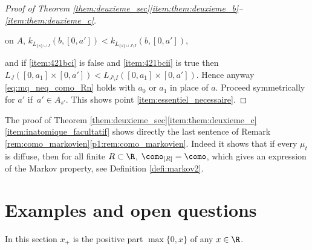 \begin{proof}[Proof of Theorem \ref{them:deuxieme_sec}\eqref{item:them:deuxieme_b}--\eqref{item:them:deuxieme_c}]
\begin{enumeratei}
\item\label{item:421bcii}
on $A$, $k_{L_{\{s\}\cup J}}(b,[0,a'])< k_{L_{\{s\}\cup J\setminus I}}(b,[0,a'])$,
\end{enumeratei}
\noindent
and if \eqref{item:421bci} is false and \eqref{item:421bcii} is true then $L_{ J}([0,a_1]\times[0,a'])< L_{ J\setminus I}([0,a_1]\times[0,a'])$. Hence anyway \eqref{eq:mq_neq_como_Rn} holds with $a_0$ or $a_1$ in place of $a$. Proceed symmetrically for $a'$ if~$a'\in A_{s'}$. This shows point \eqref{item:essentiel_necessaire}.
\end{proof}

\begin{rem}\label{rem:demo_nonatomique} The proof of Theorem \ref{them:deuxieme_sec}\eqref{item:them:deuxieme_c}\eqref{item:inatomique_facultatif} shows directly the last sentence of Remark \ref{rem:como_markovien}\eqref{p1:rem:como_markovien}. Indeed it shows that if every $\mu_t$ is diffuse, then for all finite $R\subset\R$, $\como_{[R]}=\como$, which gives an expression of the Markov property, see Definition \ref{defi:markov2}.
\end{rem}

\section{Examples and open questions}\label{sec:exemples}

In this section $x_+$ is the positive part $\max\{0,x\}$ of any $x\in\R$.

